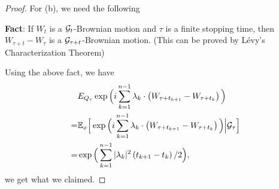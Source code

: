 \begin{proof}
    For (b), we need the following
    \begin{framed}
        {\bf Fact}: If $W_t$ is a ${\mathcal G}_t$-Brownian motion and $\tau$ is a finite stopping time, then $W_{\tau+t}-W_{\tau}$ is a ${\mathcal G}_{\tau+t}$-Brownian motion. (This can be proved by L\'evy's Characterization Theorem)
    \end{framed}
    Using the above fact, we have 
    \begin{equation*}
	\begin{aligned}
            &E_{Q_\tau} \exp \Big(i \sum_{k=1}^{n-1} \lambda_{k} \cdot\left(W_{\tau+t_{k+1}}-W_{\tau+t_{k}}\right)\Big)\\
            =&{\mathbb E}_{x} \Big[ \exp \Big(i \sum_{k=1}^{n-1} \lambda_{k} \cdot\left(W_{\tau+t_{k+1}}-W_{\tau+t_{k}}\right)\Big)\Big|{\mathcal G}_\tau\Big]\\
            =& \exp \Big(\sum_{k=1}^{n-1}  |\lambda_k|^2\left(t_{k+1}-t_{k}\right) / 2\Big), 
	\end{aligned}
    \end{equation*}
    we get what we claimed.
\end{proof}